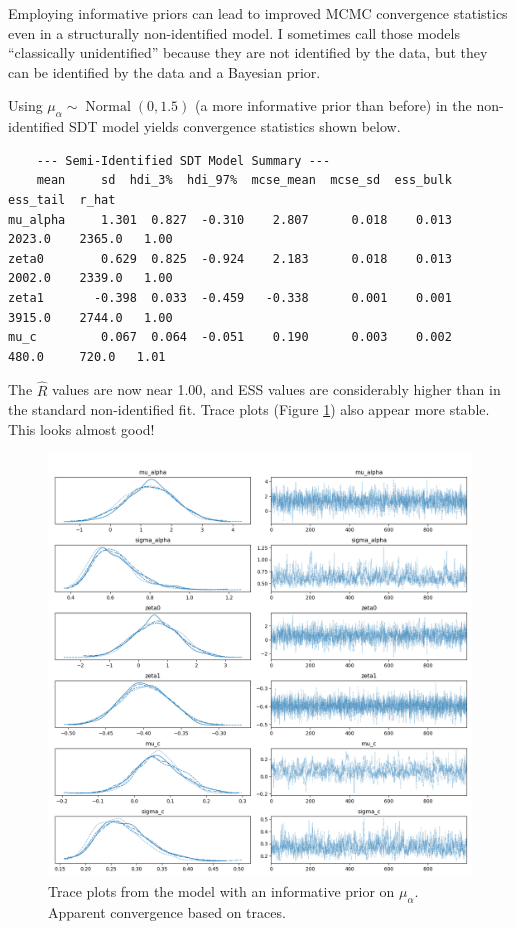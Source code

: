 \documentclass[12pt]{article}
\DeclareMathOperator{\Normal}{Normal}
\begin{document}
Employing informative priors can lead to improved MCMC convergence statistics even in a structurally non-identified model. I sometimes call those models ``classically unidentified'' because they are not identified by the data, but they can be identified by the data and a Bayesian prior.

Using $\mu_\alpha \sim \Normal(0, 1.5)$ (a more informative prior than before) in the non-identified SDT model yields convergence statistics shown below.

\footnotesize
\begin{verbatim}
    --- Semi-Identified SDT Model Summary ---
    mean     sd  hdi_3%  hdi_97%  mcse_mean  mcse_sd  ess_bulk  ess_tail  r_hat
mu_alpha     1.301  0.827  -0.310    2.807      0.018    0.013    2023.0    2365.0   1.00
zeta0        0.629  0.825  -0.924    2.183      0.018    0.013    2002.0    2339.0   1.00
zeta1       -0.398  0.033  -0.459   -0.338      0.001    0.001    3915.0    2744.0   1.00
mu_c         0.067  0.064  -0.051    0.190      0.003    0.002     480.0     720.0   1.01
\end{verbatim}\normalsize

The $\hat{R}$ values are now near 1.00, and ESS values are considerably higher than in the standard non-identified fit. Trace plots (Figure \ref{fig:semiid_trace}) also appear more stable.  This looks almost good!

\begin{figure}[tbhp]
    \centering
    \includegraphics[width=\linewidth]{semiid_sdt_trace.png}
    \caption{Trace plots from the model with an informative prior on $\mu_\alpha$. Apparent convergence based on traces.}
    \label{fig:semiid_trace}
\end{figure}
\end{document}
